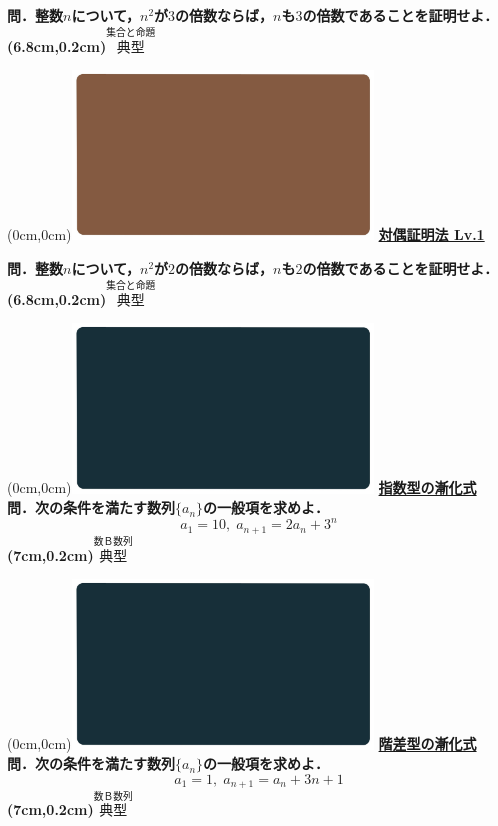 \documentclass[10pt,
fleqn,
dvipdfmx,
uplatex
]{jsarticle}
\begin{document}
\LARGE 
\bf\boldmath 問．整数$n$について，$n^2$が$3$の倍数ならば，$n$も$3$の倍数であることを証明せよ．
\at(6.8cm,0.2cm){\small\color{bradorange}$\overset{\text{集合と命題}}{\text{典型}}$}


\newpage



\at(0cm,0cm){\includegraphics[width=8cm,bb=0 0 1920 1080]{./youtube/thumbnails/templates/smart_background/集合と命題.jpeg}}
{\color{orange}\bf\boldmath\LARGE\underline{対偶証明法 Lv.1 }}\vspace{0.3zw}

\LARGE 
\bf\boldmath 問．整数$n$について，$n^2$が$2$の倍数ならば，$n$も$2$の倍数であることを証明せよ．
\at(6.8cm,0.2cm){\small\color{bradorange}$\overset{\text{集合と命題}}{\text{典型}}$}


\newpage



\at(0cm,0cm){\includegraphics[width=8cm,bb=0 0 1920 1080]{./youtube/thumbnails/templates/smart_background/数B数列.jpeg}}
{\color{orange}\bf\boldmath\Large\underline{指数型の漸化式}}\vspace{0.3zw}\\
\Large 
\bf\boldmath 問．次の条件を満たす数列$\{a_n\}$の一般項を求めよ．
\[a_1={10},\;a_{n+1}=2a_n+3^n\]
\at(7cm,0.2cm){\small\color{bradorange}$\overset{\text{数Ｂ数列}}{\text{典型}}$}

\newpage

\at(0cm,0cm){\includegraphics[width=8cm,bb=0 0 1920 1080]{./youtube/thumbnails/templates/smart_background/数B数列.jpeg}}
{\color{orange}\bf\boldmath\Large\underline{階差型の漸化式}}\vspace{0.3zw}\\
\Large 
\bf\boldmath 問．次の条件を満たす数列$\{a_n\}$の一般項を求めよ．
\[a_1=1,\;a_{n+1}=a_n+3n+1\]
\at(7cm,0.2cm){\small\color{bradorange}$\overset{\text{数Ｂ数列}}{\text{典型}}$}
\end{document}
